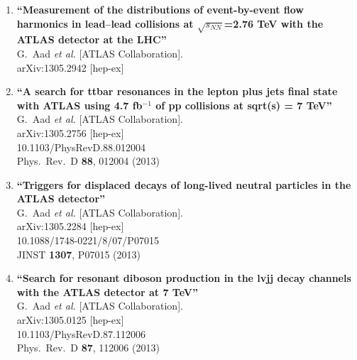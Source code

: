 \documentclass{article}
\begin{document}
\begin{enumerate}
\item%
{\bf ``Measurement of the distributions of event-by-event flow harmonics in lead--lead collisions at $\sqrt{s_{NN}}$=2.76 TeV with the ATLAS detector at the LHC''}
  \\{}G.~Aad {\it et al.}  [ATLAS Collaboration].
  \\{}arXiv:1305.2942 [hep-ex]
  


\item%
{\bf ``A search for ttbar resonances in the lepton plus jets final state with ATLAS using 4.7 fb$^{-1}$ of pp collisions at sqrt(s) = 7 TeV''}
  \\{}G.~Aad {\it et al.}  [ATLAS Collaboration].
  \\{}arXiv:1305.2756 [hep-ex]
    \\{}10.1103/PhysRevD.88.012004
\\{}Phys.\ Rev.\ D {\bf 88}, 012004 (2013) %


\item%
{\bf ``Triggers for displaced decays of long-lived neutral particles in the ATLAS detector''}
  \\{}G.~Aad {\it et al.}  [ATLAS Collaboration].
  \\{}arXiv:1305.2284 [hep-ex]
    \\{}10.1088/1748-0221/8/07/P07015
\\{}JINST {\bf 1307}, P07015 (2013) %



\item%
{\bf ``Search for resonant diboson production in the lvjj decay channels with the ATLAS detector at 7 TeV''}
  \\{}G.~Aad {\it et al.}  [ATLAS Collaboration].
  \\{}arXiv:1305.0125 [hep-ex]
    \\{}10.1103/PhysRevD.87.112006
\\{}Phys.\ Rev.\ D {\bf 87}, 112006 (2013) %



\end{enumerate}
\end{document}
